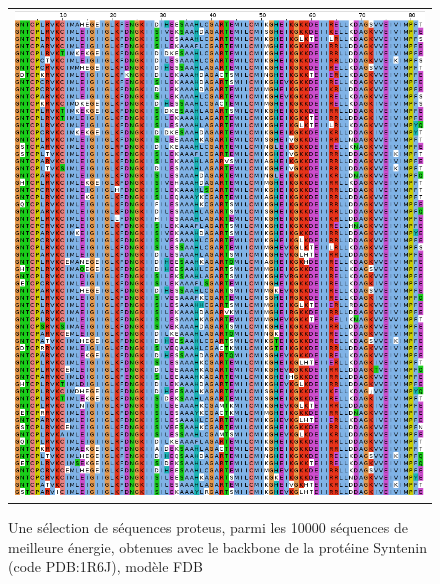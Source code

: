    \begin{figure}[t]
     \centering
     \begin{tabular}{c}
       \includegraphics[width=17cm]{proteus/1R6J.png} \\
     \end{tabular}
       \caption{Une sélection de séquences proteus, parmi les 10000 séquences de meilleure énergie, obtenues avec le backbone de la protéine Syntenin (code PDB:1R6J), modèle FDB}
\label{align_proteus:Syntenin}
   \end{figure}
\clearpage

